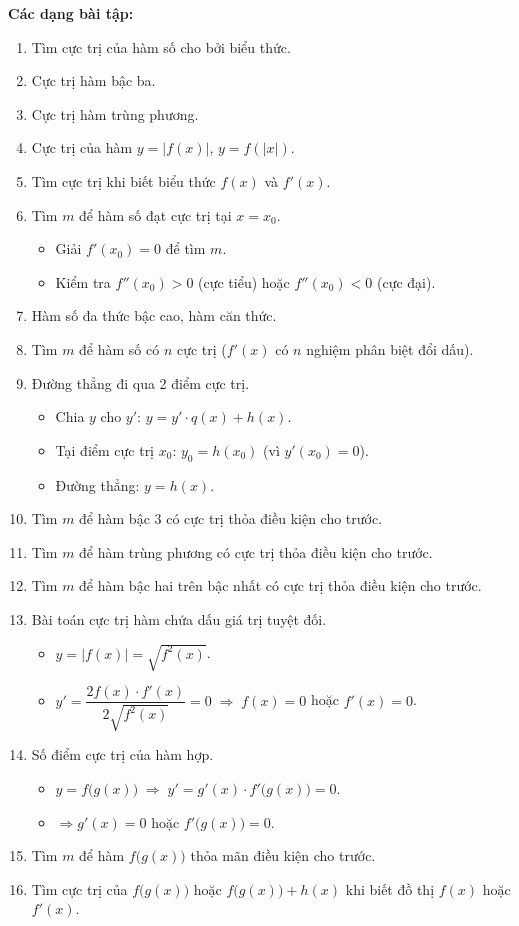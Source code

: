 \documentclass[12pt,a4paper]{article}
\begin{document}
\medskip\noindent\textbf{Các dạng bài tập:}
\begin{enumerate}[label=\textbf{Dạng \arabic*:}, leftmargin=*, align=left]
  \item Tìm cực trị của hàm số cho bởi biểu thức.
  \item Cực trị hàm bậc ba.
  \item Cực trị hàm trùng phương.
  \item Cực trị của hàm $y = |f(x)|$, $y = f(|x|)$.
  \item Tìm cực trị khi biết biểu thức $f(x)$ và $f'(x)$.
  \item Tìm $m$ để hàm số đạt cực trị tại $x = x_0$.
    \begin{itemize}
      \item Giải $f'(x_0) = 0$ để tìm $m$.
      \item Kiểm tra $f''(x_0) > 0$ (cực tiểu) hoặc $f''(x_0) < 0$ (cực đại).
    \end{itemize}
  \item Hàm số đa thức bậc cao, hàm căn thức.
  \item Tìm $m$ để hàm số có $n$ cực trị ($f'(x)$ có $n$ nghiệm phân biệt đổi dấu).
  \item Đường thẳng đi qua 2 điểm cực trị.
    \begin{itemize}
      \item Chia $y$ cho $y'$: $y = y' \cdot q(x) + h(x)$.
      \item Tại điểm cực trị $x_0$: $y_0 = h(x_0)$ (vì $y'(x_0) = 0$).
      \item Đường thẳng: $y = h(x)$.
    \end{itemize}
  \item Tìm $m$ để hàm bậc 3 có cực trị thỏa điều kiện cho trước.
  \item Tìm $m$ để hàm trùng phương có cực trị thỏa điều kiện cho trước.
  \item Tìm $m$ để hàm bậc hai trên bậc nhất có cực trị thỏa điều kiện cho trước.
  \item Bài toán cực trị hàm chứa dấu giá trị tuyệt đối.
    \begin{itemize}
      \item $y = |f(x)| = \sqrt{f^2(x)}$.
      \item $y' = \dfrac{2f(x) \cdot f'(x)}{2\sqrt{f^2(x)}} = 0 \;\Rightarrow\; f(x) = 0$ hoặc $f'(x) = 0$.
    \end{itemize}
  \item Số điểm cực trị của hàm hợp.
    \begin{itemize}
      \item $y = f\bigl(g(x)\bigr) \;\Rightarrow\; y' = g'(x) \cdot f'\bigl(g(x)\bigr) = 0$.
      \item $\Rightarrow g'(x) = 0$ hoặc $f'\bigl(g(x)\bigr) = 0$.
    \end{itemize}
  \item Tìm $m$ để hàm $f\bigl(g(x)\bigr)$ thỏa mãn điều kiện cho trước.
  \item Tìm cực trị của $f\bigl(g(x)\bigr)$ hoặc $f\bigl(g(x)\bigr) + h(x)$ khi biết đồ thị $f(x)$ hoặc $f'(x)$.
\end{enumerate}
\end{document}
